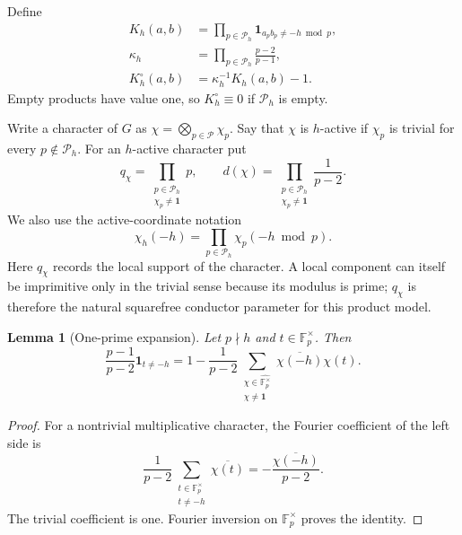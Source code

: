 \documentclass[11pt]{article}
\newtheorem{lemma}[theorem]{Lemma}
\theoremstyle{definition}
\theoremstyle{remark}
\newcommand{\F}{\mathbb F}
\newcommand{\one}{\mathbf 1}
\newcommand{\cP}{\mathcal P}
\begin{document}
Define
\begin{align}
 K_h(a,b)
  &=\prod_{p\in\cP_h}\one_{a_pb_p\ne-h\bmod p},\label{eq:binary-kernel}\\
 \kappa_h
  &=\prod_{p\in\cP_h}\frac{p-2}{p-1},\label{eq:kappa-h}\\
 K_h^\circ(a,b)
  &=\kappa_h^{-1}K_h(a,b)-1.\label{eq:centered-kernel}
\end{align}
Empty products have value one, so $K_h^\circ\equiv0$ if $\cP_h$ is empty.

Write a character of $G$ as $\chi=\bigotimes_{p\in\cP}\chi_p$.  Say that $\chi$ is $h$-active if $\chi_p$ is trivial for every $p\notin\cP_h$.  For an $h$-active character put
\begin{equation}\label{eq:character-conductor-weight}
 q_\chi=\prod_{\substack{p\in\cP_h\\\chi_p\ne\one}}p,
 \qquad
 d(\chi)=\prod_{\substack{p\in\cP_h\\\chi_p\ne\one}}\frac1{p-2}.
\end{equation}
We also use the active-coordinate notation
\begin{equation}\label{eq:active-character-value}
 \chi_h(-h)=\prod_{p\in\cP_h}\chi_p(-h\bmod p).
\end{equation}
Here $q_\chi$ records the local support of the character.  A local component can itself be imprimitive only in the trivial sense because its modulus is prime; $q_\chi$ is therefore the natural squarefree conductor parameter for this product model.

\begin{lemma}[One-prime expansion]\label{lem:one-prime-expansion}
Let $p\nmid h$ and $t\in\F_p^\times$.  Then
\begin{equation}\label{eq:one-prime-expansion}
 \frac{p-1}{p-2}\one_{t\ne-h}
 =1-\frac1{p-2}
 \sum_{\substack{\chi\in\widehat{\F_p^\times}\\\chi\ne\one}}
 \overline{\chi(-h)}\chi(t).
\end{equation}
\end{lemma}

\begin{proof}
For a nontrivial multiplicative character, the Fourier coefficient of the left side is
\[
 \frac1{p-2}\sum_{\substack{t\in\F_p^\times\\t\ne-h}}
 \overline{\chi(t)}
 =-\frac{\overline{\chi(-h)}}{p-2}.
\]
The trivial coefficient is one.  Fourier inversion on $\F_p^\times$ proves the identity.
\end{proof}
\end{document}
